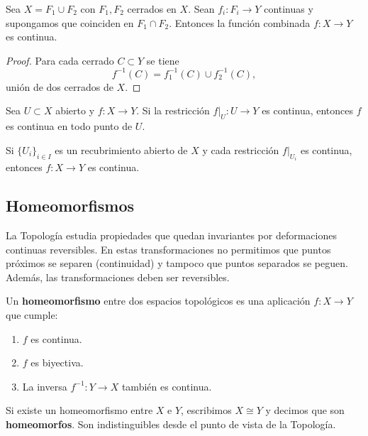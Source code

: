 \begin{proposición}
    Sea $X=F_1\cup F_2$ con $F_1,F_2$ cerrados en $X$. Sean $f_i:F_i\to Y$ continuas y supongamos que coinciden en $F_1\cap F_2$. Entonces la función combinada $f:X\to Y$ es continua.
\end{proposición}
\begin{proof}
    Para cada cerrado $C\subset Y$ se tiene
    $$f^{-1}(C)=f_1^{-1}(C)\cup f_2^{-1}(C),$$
    unión de dos cerrados de $X$.
\end{proof}

\begin{proposición}
    Sea $U\subset X$ abierto y $f:X\to Y$. Si la restricción $f|_U:U\to Y$ es continua, entonces $f$ es continua en todo punto de $U$.
\end{proposición}

\begin{proposición}
    Si $\{U_i\}_{i\in I}$ es un recubrimiento abierto de $X$ y cada restricción $f|_{U_i}$ es continua, entonces $f:X\to Y$ es continua.
\end{proposición}

\subsection{Homeomorfismos}

La Topología estudia propiedades que quedan invariantes por deformaciones continuas reversibles. En estas transformaciones no permitimos que puntos próximos se separen (continuidad) y tampoco que puntos separados se peguen. Además, las transformaciones deben ser reversibles.

\begin{definición}[Homeomorfismo]
    Un \textbf{homeomorfismo} entre dos espacios topológicos es una aplicación $f: X \to Y$ que cumple:
    \begin{enumerate}
        \item $f$ es continua.
        \item $f$ es biyectiva.
        \item La inversa $f^{-1}: Y \to X$ también es continua.
    \end{enumerate}
    Si existe un homeomorfismo entre $X$ e $Y$, escribimos $X \cong Y$ y decimos que son \textbf{homeomorfos}. Son indistinguibles desde el punto de vista de la Topología.
\end{definición}

